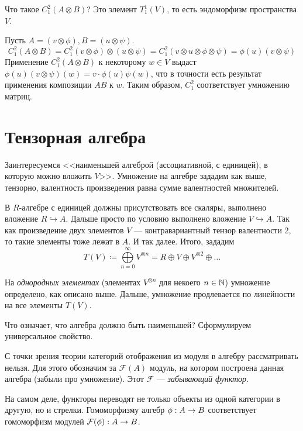 {{        Что такое $C_1^2(A \otimes B)$?
        Это элемент $T^1_1(V)$, то есть эндоморфизм пространства $V$.

        Пусть $A = (v\otimes \phi), B = (u \otimes \psi)$.
        \[C_1^2(A \otimes B) = C_1^2(v \otimes \phi) \otimes (u \otimes \psi) = C^2_1(v \otimes u \otimes \phi \otimes \psi) = \phi(u)(v \otimes \psi)\]
        Применение $C^2_1(A \otimes B)$ к некоторому $w \in V$ выдаст $\phi(u)(v \otimes \psi)(w) = v \cdot \phi(u)\psi(w)$, что в точности есть результат применения композиции $AB$ к $w$.
        Таким образом, $C^2_1$ соответствует умножению матриц.
    }
}


\section{Тензорная алгебра}
Заинтересуемся <<наименьшей алгеброй (ассоциативной, с единицей), в которую можно вложить $V$>>.
Умножение на алгебре зададим как выше, тензорно, валентность произведения равна сумме валентностей множителей.

В $R$-алгебре с единицей должны присутствовать все скаляры, выполнено вложение $R \hookrightarrow A$.
Дальше просто по условию выполнено вложение $V \hookrightarrow A$.
Так как произведение двух элементов $V$ --- контравариантный тензор валентности 2, то такие элементы тоже лежат в $A$.
И так далее.
Итого, зададим
\[T(V) \coloneqq \bigoplus\limits_{n = 0}^{\infty}V^{\otimes n} = R \oplus V \oplus V^{\otimes 2} \oplus \dots\]

На \textit{однородных элементах} (элементах $V^{\otimes n}$ для некоего $n \in \mathbb{N}$) умножение определено, как описано выше.
Дальше, умножение продлевается по линейности на все элементы $T(V)$.

Что означает, что алгебра должно быть наименьшей?
Сформулируем универсальное свойство.

С точки зрения теории категорий отображения из модуля в алгебру рассматривать нельзя.
Для этого обозначим за $\mathcal{F}(A)$ модуль, на котором построена данная алгебра (забыли про умножение).
Этот $\mathcal{F}$ --- \textit{забывающий функтор}.

На самом деле, функторы переводят не только объекты из одной категории в другую, но и стрелки.
Гомоморфизму алгебр $\phi: A \rightarrow B$ соответствует гомоморфизм модулей $\mathcal{F}(\phi): A \rightarrow B$.

